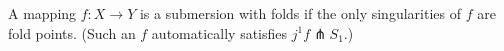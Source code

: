 A mapping $f: X \to Y$ is a submersion with folds if the only singularities of $f$ are fold points. (Such an $f$ automatically satisfies $j^1 f \pitchfork S_1$.)
